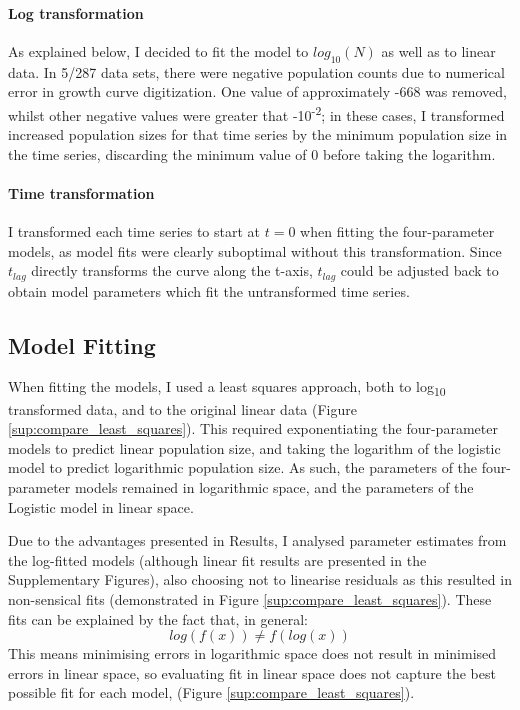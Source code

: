 \documentclass[11pt, a4paper]{article}
\begin{document}
\begin{linenumbers}
\paragraph{Log transformation}
As explained below, I decided to fit the model to $log_{10}(N)$ as well as to linear data. In 5/287 data sets, there were negative population counts due to numerical error in growth curve digitization. One value of approximately -668 was removed, whilst other negative values were greater that -10\textsuperscript{-2}; in these cases, I transformed increased population sizes for that time series by the minimum population size in the time series, discarding the minimum value of 0 before taking the logarithm.  

\paragraph{Time transformation}
I transformed each time series to start at $t = 0$ when fitting the four-parameter models, as model fits were clearly suboptimal without this transformation. Since $t_{lag}$ directly transforms the curve along the t-axis, $t_{lag}$ could be adjusted back to obtain model parameters which fit the untransformed time series. 

\subsection{Model Fitting}
When fitting the models, I used a least squares approach, both to log\textsubscript{10} transformed data, and to the original linear data (Figure \ref{sup:compare_least_squares}). This required exponentiating the four-parameter models to predict linear population size, and taking the logarithm of the logistic model to predict logarithmic population size. As such, the parameters of the four-parameter models remained in logarithmic space, and the parameters of the Logistic model in linear space. 

Due to the advantages presented in Results, I analysed parameter estimates from the log-fitted models (although linear fit results are presented in the Supplementary Figures), also choosing not to linearise residuals as this resulted in non-sensical fits (demonstrated in Figure \ref{sup:compare_least_squares}). These fits can be explained by the fact that, in general:
\[log(f(x) ) \neq f(log(x))\]
This means minimising errors in logarithmic space does not result in minimised errors in linear space, so evaluating fit in linear space does not capture the best possible fit for each model, (Figure \ref{sup:compare_least_squares}).


\end{linenumbers}
\end{document}
